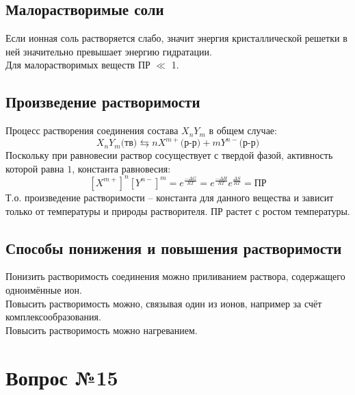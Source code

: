 \documentclass[14pt,a4paper]{scrartcl}
\begin{document}
\subsection*{Малорастворимые соли}
Если ионная соль растворяется слабо, значит энергия кристаллической решетки в ней значительно превышает энергию гидратации.\\
Для малорастворимых веществ ПР $\ll$ 1.
\subsection*{Произведение растворимости}
Процесс растворения соединения состава $X_nY_m$ в общем случае:
$$ X_nY_m \text{(тв)} \leftrightarrows n X^{m+} \text{(р-р)} + mY^{n-} \text{(р-р)}$$
Поскольку при равновесии раствор сосуществует с твердой фазой, активность которой равна $1$, константа равновесия:
$$ \left[X^{m+} \right]^n\left[Y^{n-} \right]^m = e^{\frac{-\Delta{G}}{RT}} = 
e^{\frac{-\Delta{H}}{RT}} e^{\frac{\Delta{S}}{RT}} = \text{ПР} $$
Т.о. произведение растворимости -- константа для данного вещества и зависит только от температуры и природы растворителя. ПР растет с ростом температуры.
\subsection*{Способы понижения и повышения растворимости}
Понизить растворимость соединения можно приливанием раствора, содержащего одноимённые ион. \\
Повысить растворимость можно, связывая один из ионов, например за счёт комплексообразования. \\
Повысить растворимость можно нагреванием.




\section*{Вопрос №15}
\end{document}
